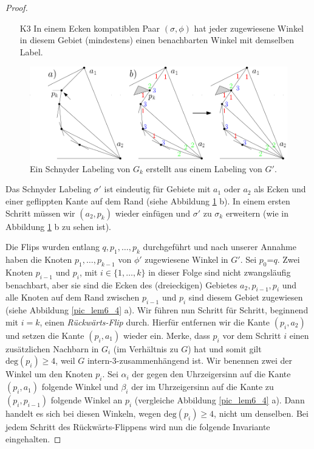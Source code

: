 \begin{proof}
\begin{itemize} 
\item [K3] In einem Ecken kompatiblen Paar $(\sigma,\phi)$ hat jeder zugewiesene Winkel in diesem Gebiet (mindestens) einen benachbarten Winkel mit demselben Label.
\end{itemize}

\begin{figure}
	\centering
	  \includegraphics[width=1\textwidth]{lem6_3.png}
    	\caption{Ein Schnyder Labeling von $G_k$ erstellt aus einem Labeling von $G'$. }
    	\label{pic_lem6_3}
\end{figure}

Das Schnyder Labeling $\sigma'$ ist eindeutig für Gebiete mit $a_1$ oder $a_2$ als Ecken und einer geflippten Kante auf dem Rand (siehe Abbildung \ref{pic_lem6_3} b). In einem ersten Schritt müssen wir $(a_2,p_k)$ wieder einfügen und $\sigma'$ zu $\sigma_k$ erweitern (wie in Abbildung \ref{pic_lem6_3} b zu sehen ist).

Die Flips wurden entlang $q,p_1,\ldots,p_k$ durchgeführt und nach unserer Annahme haben die Knoten $p_1,\ldots,p_{k-1}$ von $\phi'$ zugewiesene Winkel in $G'$. Sei $p_0$=$q$. Zwei Knoten $p_{i-1}$ und $p_i$, mit $i \in \{1,\ldots,k\}$ in dieser Folge sind nicht zwangsläufig benachbart, aber sie sind die Ecken des (dreieckigen) Gebietes $a_2,p_{i-1},p_{i}$ und alle Knoten auf dem Rand zwischen $p_{i-1}$ und $p_{i}$ sind diesem Gebiet zugewiesen (siehe Abbildung \ref{pic_lem6_4} a). Wir führen nun Schritt für Schritt, beginnend mit $i=k$, einen \textit{Rückwärts-Flip} durch. Hierfür entfernen wir die Kante $(p_{i},a_2)$ und setzen die Kante $(p_{i},a_1)$ wieder ein. Merke, dass $p_{i}$ vor dem Schritt $i$ einen zusätzlichen Nachbarn in $G_{i}$ (im Verhältnis zu $G$) hat und somit gilt $\text{deg}(p_{i}) \geq 4$, weil $G$ intern-3-zusammenhängend ist. Wir benennen zwei der Winkel um den Knoten $p_i$. Sei $\alpha_{i}$ der gegen den Uhrzeigersinn auf die Kante $(p_i,a_1)$ folgende Winkel und $\beta_{i}$ der im Uhrzeigersinn auf die Kante zu $(p_i,p_{i-1})$ folgende Winkel an $p_{i}$ (vergleiche Abbildung \ref{pic_lem6_4} a). Dann handelt es sich bei diesen Winkeln, wegen $\text{deg}(p_i) \geq 4$, nicht um denselben. Bei jedem Schritt des Rückwärts-Flippens wird nun die folgende Invariante eingehalten.


\end{proof}
